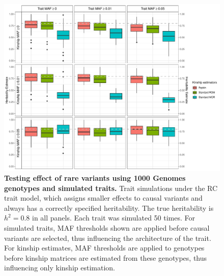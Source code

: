 \documentclass[11pt]{article}
\begin{document}
\begin{figure}[bp!]
  \centering
  \includegraphics[width=\textwidth]{data/tgp_sim_rc.pdf}
  \caption{
    {\bf Testing effect of rare variants using 1000 Genomes genotypes and simulated traits.}
    Trait simulations under the RC trait model, which assigns smaller effects to causal variants and always has a correctly specified heritability.
    The true heritability is $h^2 = 0.8$ in all panels. Each trait was simulated 50 times. 
    For simulated traits, MAF thresholds shown are applied before causal variants are selected, thus influencing the architecture of the trait.
    For kinship estimates, MAF thresholds are applied to genotypes before kinship matrices are estimated from these genotypes, thus influencing only kinship estimation.
    }
  \label{fig:tgp_sim_rc}
\end{figure}
\end{document}
